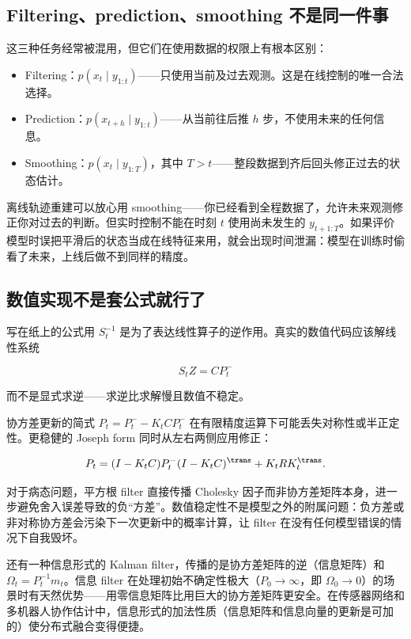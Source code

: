 \subsection{Filtering、prediction、smoothing 不是同一件事}

这三种任务经常被混用，但它们在使用数据的权限上有根本区别：

\begin{itemize}
\tightlist
\item
  Filtering：\(p(x_t \mid y_{1:t})\)——只使用当前及过去观测。这是在线控制的唯一合法选择。
\item
  Prediction：\(p(x_{t+h} \mid y_{1:t})\)——从当前往后推 \(h\) 步，不使用未来的任何信息。
\item
  Smoothing：\(p(x_t \mid y_{1:T})\)，其中 \(T > t\)——整段数据到齐后回头修正过去的状态估计。
\end{itemize}

离线轨迹重建可以放心用 smoothing——你已经看到全程数据了，允许未来观测修正你对过去的判断。但实时控制不能在时刻 \(t\) 使用尚未发生的 \(y_{t+1:T}\)。如果评价模型时误把平滑后的状态当成在线特征来用，就会出现时间泄漏：模型在训练时偷看了未来，上线后做不到同样的精度。

\subsection{数值实现不是套公式就行了}

写在纸上的公式用 \(S_t^{-1}\) 是为了表达线性算子的逆作用。真实的数值代码应该解线性系统

\[
S_t Z = C P_t^-
\]

而不是显式求逆——求逆比求解慢且数值不稳定。

协方差更新的简式 \(P_t = P_t^- - K_t C P_t^-\) 在有限精度运算下可能丢失对称性或半正定性。更稳健的 Joseph form 同时从左右两侧应用修正：

\[
P_t = (I - K_t C) P_t^- (I - K_t C)^{\trans} + K_t R K_t^{\trans}.
\]

对于病态问题，平方根 filter 直接传播 Cholesky 因子而非协方差矩阵本身，进一步避免舍入误差导致的负``方差''。数值稳定性不是模型之外的附属问题：负方差或非对称协方差会污染下一次更新中的概率计算，让 filter 在没有任何模型错误的情况下自我毁坏。

还有一种信息形式的 Kalman filter，传播的是协方差矩阵的逆（信息矩阵）和 \(\Omega_t = P_t^{-1} m_t\)。信息 filter 在处理初始不确定性极大（\(P_0 \to \infty\)，即 \(\Omega_0 \to 0\)）的场景时有天然优势——用零信息矩阵比用巨大的协方差矩阵更安全。在传感器网络和多机器人协作估计中，信息形式的加法性质（信息矩阵和信息向量的更新是可加的）使分布式融合变得便捷。

